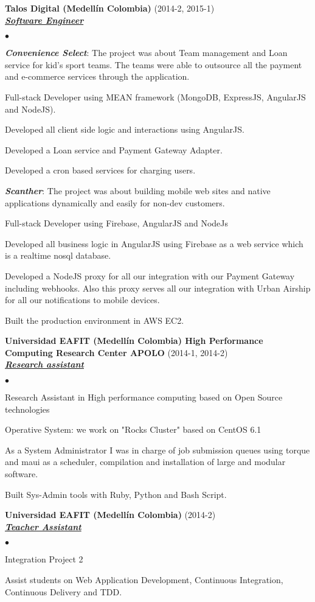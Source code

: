 \documentclass[a4paper]{article}
\newcommand{\employer}[3]{{
\textbf{#1} (#2)\\ \underline{\textbf{\emph{#3}}}\\ }}
\newenvironment{achievements}{\begin{list}{$\bullet$}{\topsep 0pt \itemsep
-2pt}}{\vspace*{4pt}\end{list}}
\newcommand{\emphasys}[1]{\textbf{\emph{#1}}}
\begin{document}
\employer{ Talos Digital (Medell\'in Colombia)}{2014-2, 2015-1}{Software Engineer}
\begin{achievements}
\item \emphasys{Convenience Select}: The project was about Team management and Loan service for kid's sport teams. The teams were able to outsource all the payment and e-commerce services through the application.
\item Full-stack Developer using MEAN framework  (MongoDB, ExpressJS, AngularJS and NodeJS).
\item Developed all client side logic and interactions using AngularJS.
\item Developed a Loan service and Payment Gateway Adapter.
\item Developed a cron based services for charging users.
\item \emphasys{Scanther}: The project was about building mobile web sites and native applications dynamically and easily for non-dev customers.
\item Full-stack Developer using Firebase, AngularJS and NodeJs
\item Developed all business logic in AngularJS using Firebase as a web service which is a realtime nosql database.
\item Developed a NodeJS proxy for all our integration with our Payment Gateway including webhooks. Also this proxy serves all our integration with Urban Airship for all our notifications to mobile devices.
\item Built the production environment in AWS EC2.
\end{achievements}

\employer{ Universidad EAFIT (Medell\'in Colombia) High Performance Computing Research Center APOLO}{2014-1, 2014-2}{Research assistant}
\begin{achievements}
\item Research Assistant in High performance computing based on Open Source technologies
\item Operative System: we work on "Rocks Cluster" based on CentOS 6.1
\item As a System Administrator I was in charge of job submission queues using torque and maui as a scheduler, compilation and installation of large and modular software.
\item Built Sys-Admin tools with Ruby, Python and Bash Script.
\end{achievements}

\employer{ Universidad EAFIT (Medell\'in Colombia) }{2014-2}{Teacher Assistant}
\begin{achievements}
\item Integration Project 2
\item Assist students on Web Application Development, Continuous Integration, Continuous Delivery and TDD.
\end{achievements}
\end{document}
